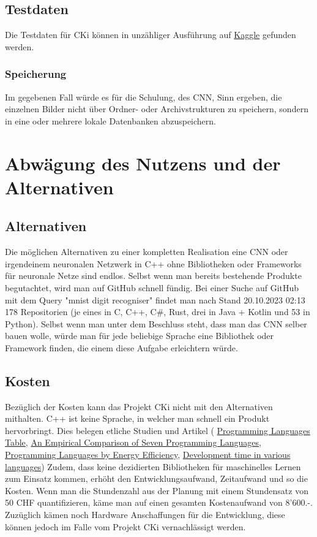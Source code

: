 \subsection{Testdaten}
\label{sec:AnalyseTestdaten}
Die Testdaten für CKi können in unzähliger Ausführung auf \href{https://www.kaggle.com/}{Kaggle} gefunden werden.

\subsubsection{Speicherung}
\label{sec:AnalyseSpeicherung}
Im gegebenen Fall würde es für die Schulung, des CNN, Sinn ergeben, die einzelnen Bilder nicht über Ordner- oder Archivstrukturen zu speichern, sondern in eine oder mehrere lokale Datenbanken abzuspeichern.

\section{Abwägung des Nutzens und der Alternativen}
\label{sec:AnalyseNutzwertanalyseDerLösungsvarianten}
\subsection{Alternativen}
\label{sec:AnalyseAlternativen}
Die möglichen Alternativen zu einer kompletten Realisation eine CNN oder irgendeinem neuronalen Netzwerk in C++ ohne Bibliotheken oder Frameworks für neuronale Netze sind endlos. 
Selbst wenn man bereits bestehende Produkte begutachtet, wird man auf GitHub schnell fündig. Bei einer Suche auf GitHub mit dem Query "mnist digit recogniser" findet man nach Stand 20.10.2023 02:13 178 Repositorien (je eines in C, C++, C\#, Rust, drei in Java + Kotlin und 53 in Python).
Selbst wenn man unter dem Beschluss steht, dass man das CNN selber bauen wolle, würde man für jede beliebige Sprache eine Bibliothek oder Framework finden, die einem diese Aufgabe erleichtern würde.

\subsection{Kosten}
\label{sec:AnalyseKosten}
Bezüglich der Kosten kann das Projekt CKi nicht mit den Alternativen mithalten. C++ ist keine Sprache, in welcher man schnell ein Produkt hervorbringt. Dies belegen etliche Studien und Artikel (
\href{https://www.cs.bsu.edu/homepages/dmz/cs697/langtbl.htm}{Programming Languages Table}, 
\href{https://citeseerx.ist.psu.edu/viewdoc/download?doi=10.1.1.113.1831&rep=rep1&type=pdf}{An Empirical Comparison of Seven Programming Languages},
\href{https://haslab.github.io/SAFER/scp21.pdf}{Programming Languages by Energy Efficiency}, 
\href{https://stackoverflow.com/questions/1894453/development-time-in-various-languages}{Development time in various languages})
Zudem, dass keine dezidierten Bibliotheken für maschinelles Lernen zum Einsatz kommen, erhöht den Entwicklungsaufwand, Zeitaufwand und so die Kosten.
Wenn man die Stundenzahl aus der Planung mit einem Stundensatz von 50 CHF quantifizieren, käme man auf einen gesamten Kostenaufwand von 8'600.-. Zuzüglich kämen noch Hardware Anschaffungen für die Entwicklung, diese können jedoch im Falle vom Projekt CKi vernachlässigt werden.  

